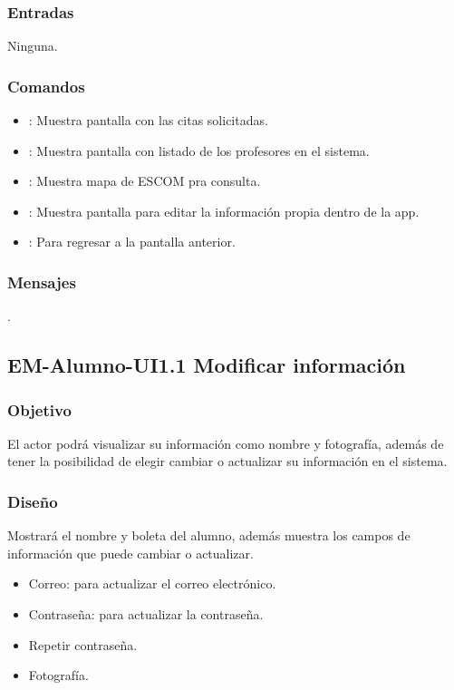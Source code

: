 \subsubsection{Entradas}
	\noindent
	Ninguna.

\subsubsection{Comandos}
\begin{itemize}
	\item {}: Muestra pantalla con las citas solicitadas.
	\item {}: Muestra pantalla con listado de los profesores en el sistema.
	\item {}: Muestra mapa de ESCOM pra consulta.
	\item {}: Muestra pantalla para editar la información propia dentro de la app.
	\item {}: Para regresar a la pantalla anterior.
\end{itemize}

\subsubsection{Mensajes}
	\noindent.




\pagebreak
\subsection{EM-Alumno-UI1.1 Modificar información}

\subsubsection{Objetivo}
	\noindent
	El actor podrá visualizar su información como nombre y fotografía, además de tener la posibilidad de elegir cambiar o actualizar su información en el sistema. 

\subsubsection{Diseño}
	\noindent
	Mostrará el nombre y boleta del alumno, además muestra los campos de información que puede cambiar o actualizar.
	\begin{itemize} 
		\item Correo: para actualizar el correo electrónico.
		\item Contraseña: para actualizar la contraseña.
		\item Repetir contraseña.
		\item Fotografía. 
	\end{itemize} 

